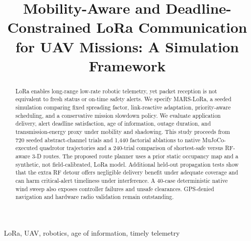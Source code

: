 \documentclass[conference]{IEEEtran}
\title{Mobility-Aware and Deadline-Constrained LoRa Communication for UAV Missions: A Simulation Framework}
\author{\IEEEauthorblockN{Lalit Kumar}\IEEEauthorblockA{Robotics and Automation, MANIT Bhopal, India}}
\begin{document}
\maketitle
\begin{abstract}
LoRa enables long-range low-rate robotic telemetry, yet packet reception is not equivalent to fresh status or on-time safety alerts. We specify MARS-LoRa, a seeded simulation comparing fixed spreading factor, link-reactive adaptation, priority-aware scheduling, and a conservative mission slowdown policy. We evaluate application delivery, alert deadline satisfaction, age of information, outage duration, and transmission-energy proxy under mobility and shadowing. This study proceeds from 720 seeded abstract-channel trials and 1,440 factorial ablations to native MuJoCo-executed quadrotor trajectories and a 240-trial comparison of shortest-safe versus RF-aware 3-D routes. The proposed route planner uses a prior static occupancy map and a synthetic, not field-calibrated, LoRa model. Additional held-out propagation tests show that the extra RF detour offers negligible delivery benefit under adequate coverage and can harm critical-alert timeliness under interference. A 40-case deterministic native wind sweep also exposes controller failures and unsafe clearances. GPS-denied navigation and hardware radio validation remain outstanding.
\end{abstract}
\begin{IEEEkeywords}LoRa, UAV, robotics, age of information, timely telemetry\end{IEEEkeywords}
\end{document}
